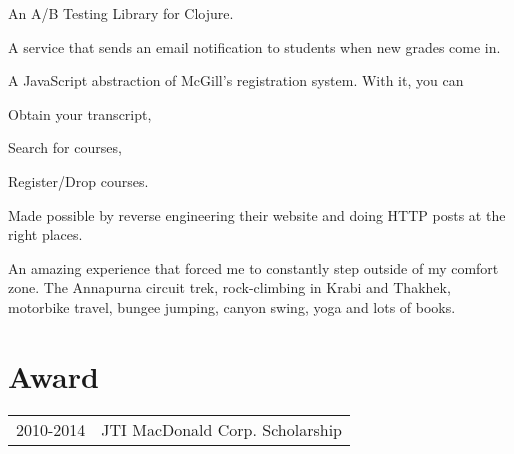 \documentclass[letterpaper]{deedy-resume} %
\begin{document}
\begin{minipage}[t]{0.66\textwidth}
An A/B Testing Library for Clojure.
\sectionspace


A service that sends an email notification to students when new grades
come in.
\sectionspace


A JavaScript abstraction of McGill's registration system.
With it, you can
\begin{tightitemize}
\item Obtain your transcript,
\item Search for courses,
\item Register/Drop courses.
\end{tightitemize}
Made possible by reverse engineering their website and doing HTTP posts at the right places.

\sectionspace


An amazing experience that forced me to constantly step outside of my
comfort zone.
The Annapurna circuit trek, rock-climbing in Krabi and Thakhek,
motorbike travel, bungee jumping, canyon swing, yoga and lots
of books.

\sectionspace %


\section{Award}

\begin{tabular}{rl}
2010-2014	 & JTI MacDonald Corp. Scholarship\\
\end{tabular}

\sectionspace %



\end{minipage}
\end{document}
